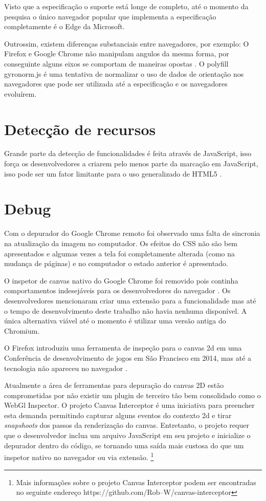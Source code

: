\begin{draft}
Visto que a especificação o suporte está longe de completo, até
o momento da pesquisa o único navegador popular que implementa a
especificação completamente é o Edge da Microsoft.

Outrossim, existem diferenças substanciais entre navegadores, por
exemplo: O Firefox e Google Chrome não manipulam angulos da mesma
forma, por conseguinte alguns eixos se comportam de maneiras opostas
\autocite{mdnOrientation}. O polyfill gyronorm.js é uma tentativa de
normalizar o uso de dados de orientação nos navegadores que pode ser
utilizada até a especificação e os navegadores evoluírem.

\section{Detecção de recursos}

Grande parte da detecção de funcionalidades é feita através de
JavaScript, isso força os desenvolvedores a criarem pelo menos parte da
marcação em JavaScript, isso pode ser um fator limitante para o uso
generalizado de HTML5 \autocite{diveIntohtml}.

\section{Debug}

Com o depurador do Google Chrome remoto foi observado uma falta de
sincronia na atualização da imagem no computador. Os efeitos do CSS
não são bem apresentados e algumas vezes a tela foi completamente
alterada (como na mudança de páginas) e no computador o estado
anterior é apresentado.

O inspetor de canvas nativo do Google Chrome foi removido pois continha
comportamentos indesejáveis para os desenvolvedores do navegador
\autocite{canvasinspector}. Os desenvolvedores mencionaram criar uma
extensão para a funcionalidade mas até o tempo de desenvolvimento
deste trabalho não havia nenhuma disponível. A única alternativa
viável até o momento é utilizar uma versão antiga do Chromium.

O Firefox introduziu uma ferramenta de inspeção para o canvas 2d
em uma Conferência de desenvolvimento de jogos em São Francisco em 2014,
mas até a tecnologia não apareceu no navegador \autocite{firefoxCanvasDebug}.

Atualmente a área de ferramentas para depuração do canvas 2D estão
comprometidas por não existir um plugin de terceiro tão bem
consolidado como o WebGl Inspector. O projeto Canvas Interceptor é
uma iniciativa para preencher esta demanda permitindo capturar alguns
eventos do contexto 2d e tirar \textit{snapshoots} dos passos da renderização
do canvas. Entretanto, o projeto requer que o desenvolvedor inclua
um arquivo JavaScript em seu projeto e inicialize o depurador dentro do código,
se tornando uma saída mais custosa do que um inspetor nativo no
navegador ou via extensão. \footnote{Mais informações sobre o
projeto Canvas Interceptor podem ser encontradas no seguinte endereço
https://github.com/Rob--W/canvas-interceptor}


\end{draft}
